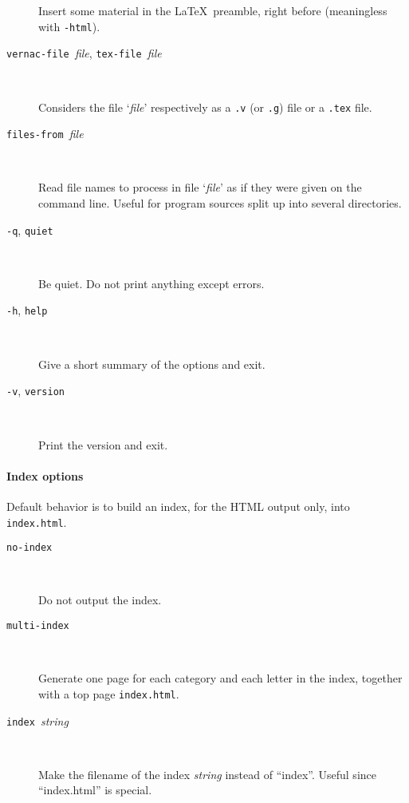 \begin{description}
  Insert some material in the \LaTeX\ preamble, right before
  \verb!! (meaningless with \texttt{-html}).

\item[\texttt{\mm{}vernac-file }\textit{file},
      \texttt{\mm{}tex-file }\textit{file}] ~\par

      Considers the file `\textit{file}' respectively as a \verb!.v!
      (or \verb!.g!) file or a \verb!.tex! file.

\item[\texttt{\mm{}files-from }\textit{file}] ~\par

  Read file names to process in file `\textit{file}' as if they were
  given on the command line. Useful for program sources split up into
  several directories.

\item[\texttt{-q}, \texttt{\mm{}quiet}] ~\par

  Be quiet. Do not print anything except errors.

\item[\texttt{-h}, \texttt{\mm{}help}] ~\par

  Give a short summary of the options and exit.

\item[\texttt{-v}, \texttt{\mm{}version}] ~\par

  Print the version and exit.

\end{description}

\paragraph{Index options}

Default behavior is to build an index, for the HTML output only, into
\texttt{index.html}.

\begin{description}

\item[\texttt{\mm{}no-index}] ~\par

  Do not output the index.

\item[\texttt{\mm{}multi-index}] ~\par

  Generate one page for each category and each letter in the index,
  together with a top page \texttt{index.html}.

\item[\texttt{\mm{}index }\textit{string}] ~\par

  Make the filename of the index \textit{string} instead of ``index''.
  Useful since ``index.html'' is special.

\end{description}

